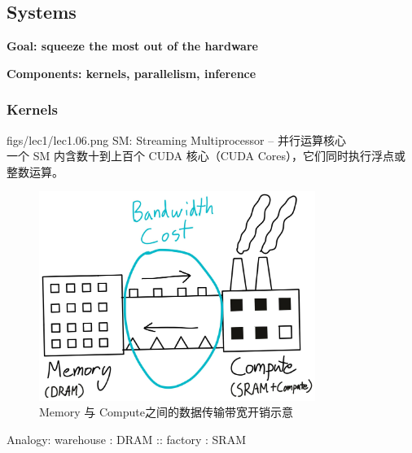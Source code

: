 \clearpage 
\subsection{Systems}

\textbf{{\color{tred} Goal: squeeze the most out of the hardware}}

\textbf{{\color{dblue} Components: kernels, parallelism, inference
}}
\subsubsection{Kernels}

\MarginImageWithNote
  {figs/lec1/lec1.06.png}
  {}
  {SM: Streaming Multiprocessor -- 并行运算核心\\ 一个 SM 内含数十到上百个 CUDA 核心（CUDA Cores），它们同时执行浮点或整数运算。}
  
\begin{figure}[ht]
  \centering
  \includegraphics[width=0.8\textwidth]{figs/lec1/lec1.07.png}
  \caption{Memory 与 Compute之间的数据传输带宽开销示意}
  \label{fig:bandwidth-cost}
\end{figure}

Analogy: warehouse : DRAM :: factory : SRAM

